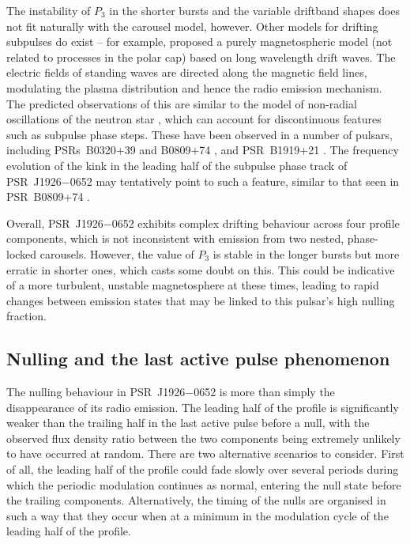 The instability of $P_3$ in the shorter bursts and the variable driftband shapes does not fit naturally with the carousel model, however. Other models for drifting subpulses do exist -- for example, \citet{GMML2005} proposed a purely magnetospheric model (not related to processes in the polar cap) based on long wavelength drift waves. The electric fields of standing waves are directed along the magnetic field lines, modulating the plasma distribution and hence the radio emission mechanism. The predicted observations of this are similar to the model of non-radial oscillations of the neutron star \citep[e.g.][]{DCxx1968, CRxx2004}, which can account for discontinuous features such as subpulse phase steps. These have been observed in a number of pulsars, including PSRs~B0320+39 and B0809+74 \citep{ESLx2003,ESxx2003b}, and PSR~B1919+21 \citep{PWxx1986,WSEx2007}. The frequency evolution of the kink in the leading half of the subpulse phase track of PSR~J1926$-$0652 may tentatively point to such a feature, similar to that seen in PSR~B0809+74 \citep{HSW+2013}.

Overall, PSR~J1926$-$0652 exhibits complex drifting behaviour across four profile components, which is not inconsistent with emission from two nested, phase-locked carousels.  However, the value of $P_3$ is stable in the longer bursts but more erratic in shorter ones, which casts some doubt on this. This could be indicative of a more turbulent, unstable magnetosphere at these times, leading to rapid changes between emission states that may be linked to this pulsar's high nulling fraction.



\subsection{Nulling and the last active pulse phenomenon}
\label{sec: J1926 - discuss - LAP}

The nulling behaviour in PSR~J1926$-$0652 is more than simply the disappearance of its radio emission. The leading half of the profile is significantly weaker than the trailing half in the last active pulse before a null, with the observed flux density ratio between the two components being extremely unlikely to have occurred at random. 
There are two alternative scenarios to consider. First of all, the leading half of the profile could fade slowly over several periods during which the periodic modulation continues as normal, entering the null state before the trailing components. Alternatively, the timing of the nulls are organised in such a way that they occur when at a minimum in the modulation cycle of the leading half of the profile.

